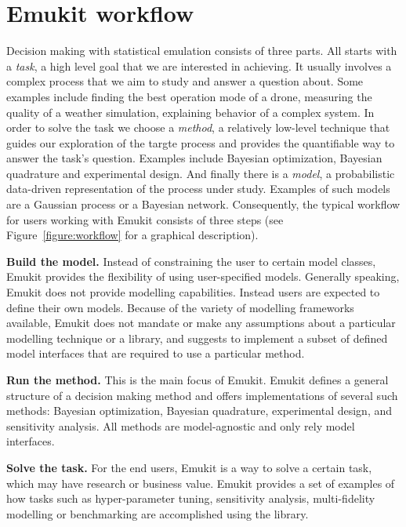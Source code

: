 \section{Emukit workflow}
Decision making with statistical emulation consists of three parts. All starts with a \textit{task}, a high level goal that we are interested in achieving. It usually involves a complex process that we aim to study and answer a question about. Some examples include finding the best operation mode of a drone, measuring the quality of a weather simulation, explaining behavior of a complex system. In order to solve the task we choose a \textit{method}, a relatively low-level technique that guides our exploration of the targte process and provides the quantifiable way to answer the task's question. Examples include Bayesian optimization, Bayesian quadrature and experimental design. And finally there is a \textit{model}, a probabilistic data-driven representation of the process under study. Examples of such models are a Gaussian process or a Bayesian network. Consequently, the typical workflow for users working with Emukit consists of three steps (see Figure~\ref{figure:workflow} for a graphical description).

\textbf{Build the model.} Instead of constraining the user to certain model classes, Emukit provides the flexibility of using user-specified models. Generally speaking, Emukit does not provide modelling capabilities. Instead users are expected to define their own models. Because of the variety of modelling frameworks available, Emukit does not mandate or make any assumptions about a particular modelling technique or a library, and suggests to implement a subset of defined model interfaces that are required to use a particular method.

\textbf{Run the method.} This is the main focus of Emukit. Emukit defines a general structure of a decision making method and offers implementations of several such methods: Bayesian optimization, Bayesian quadrature, experimental design, and sensitivity analysis. All methods are model-agnostic and only rely model interfaces.

\textbf{Solve the task.} For the end users, Emukit is a way to solve a certain task, which may have research or business value. Emukit provides a set of examples of how tasks such as hyper-parameter tuning, sensitivity analysis, multi-fidelity modelling or benchmarking are accomplished using the library.

